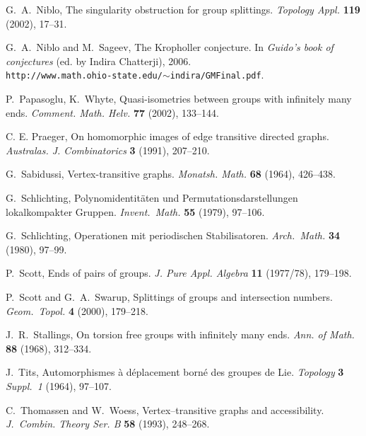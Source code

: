 \documentclass{emsprocart}
\theoremstyle{definition}
\begin{document}
\begin{thebibliography}{99}
 G.\ A.\ Niblo,
                The singularity obstruction for group splittings.
                {\em Topology Appl.}  {\bf 119} (2002), 17--31.

  G.\ A.\ Niblo and M.~Sageev,
The Kropholler conjecture.  In {\em Guido's book of conjectures}
(ed. by Indira Chatterji), 2006.\\
{\tt http://www.math.ohio-state.edu/$\sim$indira/GMFinal.pdf}.

  P.~Papasoglu, K.~Whyte,
                Quasi-isometries between groups with infinitely many ends.
                {\em Comment. Math. Helv.} {\bf  77} (2002),
                133--144.

 C. E. Praeger,
                On homomorphic images of edge transitive directed graphs.
                {\em Australas. J. Combinatorics} {\bf 3} (1991), 207--210.

 G.\ Sabidussi,
                Vertex-transitive graphs.
                {\em Monatsh. Math.} {\bf 68} (1964),  426--438.

 G.\ Schlichting,
                Polynomidentit\"aten und Permutationsdarstellungen
                lokalkompakter Gruppen.
                {\em Invent.\ Math.} {\bf 55} (1979), 97--106.

 G.\ Schlichting,
                Operationen mit periodischen Stabilisatoren.
                {\em Arch.\ Math.} {\bf 34} (1980), 97--99.

 P.~Scott,
                Ends of pairs of groups.
                {\em J. Pure Appl. Algebra} {\bf  11} (1977/78), 179--198.

 P.~Scott and G.~A.~Swarup,
                Splittings of groups and intersection numbers.
                {\em Geom.~Topol.} {\bf 4} (2000), 179--218.

 J.~R.~Stallings,
                On torsion free groups with infinitely many ends.
                {\em Ann. of Math.} {\bf 88} (1968), 312--334.

  J.\ Tits,
                Automorphismes {\`a} d{\'e}placement born{\'e}
                des groupes  de Lie.
                {\em Topology} {\bf 3} {\em Suppl.\ 1} (1964), 97--107.

 C.~Thomassen and W.~Woess,
                Vertex--transitive graphs and accessibility.
                {\em J.~Combin. Theory Ser. B} {\bf 58} (1993), 248--268.


\end{thebibliography}
\end{document}
